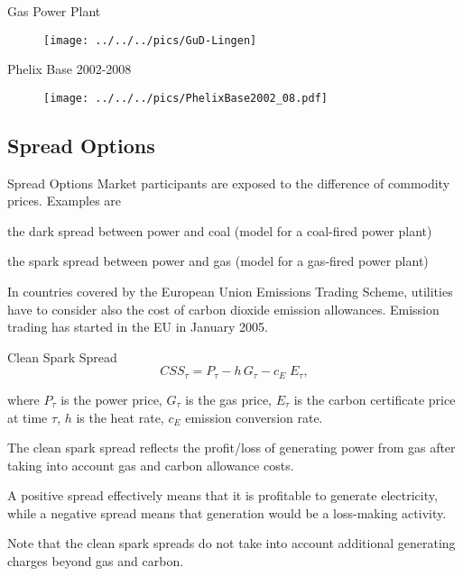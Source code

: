 {Gas Power Plant}
\begin{figure}[htp]
\centering
\texttt{[image: ../../../pics/GuD-Lingen]}
\label{prices}
\end{figure}


{Phelix Base 2002-2008}
\begin{figure}[htp]
\centering
\texttt{[image: ../../../pics/PhelixBase2002\_08.pdf]}

\end{figure}

\subsection{Spread Options}

{Spread Options}
Market participants are exposed to the difference of
commodity prices. Examples are
  \item the dark spread between power and coal (model for a coal-fired power plant)
  \item the spark spread between power and gas (model for a gas-fired power plant)
  \item In countries covered by the European Union Emissions Trading Scheme, utilities have to consider also the cost of carbon dioxide emission allowances. Emission trading has started in the EU in January 2005.


{Clean Spark Spread}
\begin{equation}
CSS_\tau= P_\tau - h\,G_\tau- c_E\;E_\tau,
\label{clean_spark_spread}
\end{equation}

where $P_\tau$ is the power price, $G_\tau$ is the gas price, $E_\tau$ is the carbon certificate price at time $\tau$, $h$ is the heat rate, $c_E$ emission conversion rate.

\item
The clean spark spread reflects the profit/loss of generating power from gas after taking into account gas and carbon allowance costs.
\item A positive spread effectively means that it is profitable to generate electricity, while a negative spread means that generation would be a loss-making activity.
\item Note that the clean spark spreads do not take into account additional generating charges beyond gas and carbon.

